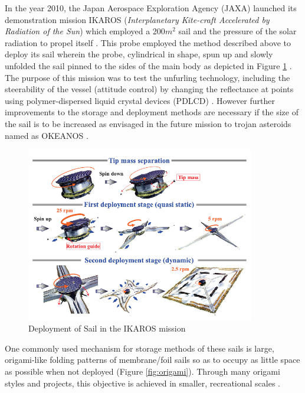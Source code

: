 In the year 2010, the Japan Aerospace Exploration Agency (JAXA) launched its demonstration mission IKAROS (\textit{Interplanetary Kite-craft Accelerated by Radiation of the Sun})
which employed a 200$m^2$ sail and the pressure of the solar radiation to propel itself \cite{TakaoY}. This probe employed the method
described above to deploy its sail wherein the probe, cylindrical in shape, spun up and slowly unfolded the sail pinned to the sides of the
main body as depicted in Figure \ref{fig:deployment} \cite{pressIKAROS}. The purpose of this mission was to test the unfurling technology, including the steerability
of the vessel (attitude control) by changing the reflectance at points using polymer-dispersed liquid crystal devices (PDLCD) \cite{Ishida2016PolarizationEO}. However further
improvements to the storage and deployment methods are necessary if the size of the sail is to be increased as envisaged in the future mission to trojan asteroids named as OKEANOS \cite{TakaoY}.

\begin{center}
\begin{figure}
    \centering
    \includegraphics[width=100mm]{deployment}
  \caption{Deployment of Sail in the IKAROS mission \protect\cite{TakaoY}}
  \label{fig:deployment}
\end{figure}
\end{center}


One commonly used mechanism for storage methods of these sails is large, origami-like folding patterns of membrane/foil sails so as to
occupy as little space as possible when not deployed (Figure \ref{fig:origami}). Through many origami styles and projects, this objective is
achieved in smaller, recreational scales \cite{ZirbelS}.


